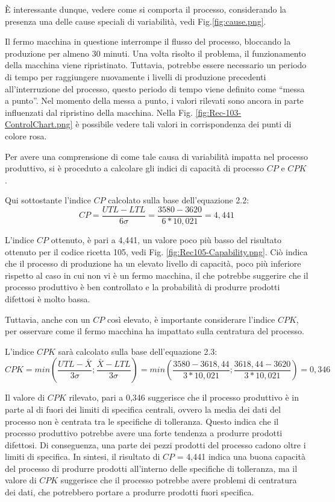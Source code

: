 È interessante dunque, vedere come si comporta il processo, considerando la presenza una delle cause speciali di variabilità, vedi Fig.\ref{fig:cause.png}.

Il fermo macchina in questione interrompe il flusso del processo, bloccando la produzione per almeno 30 minuti.
Una volta risolto il problema, il funzionamento della macchina viene ripristinato. Tuttavia, potrebbe essere necessario un periodo di tempo per raggiungere nuovamente i livelli di produzione precedenti all'interruzione del processo, questo periodo di tempo viene definito come ``messa a punto''.
Nel momento della messa a punto, i valori rilevati sono ancora in parte influenzati dal ripristino della macchina.
Nella Fig. \ref{fig:Rec-103-ControlChart.png} è possibile vedere tali valori in corrispondenza dei punti di colore rosa.

Per avere una comprensione di come tale causa di variabilità impatta nel processo produttivo, si è proceduto a calcolare gli indici di capacità di processo $CP$ e $CPK$.

Qui sottostante l'indice $CP$ calcolato sulla base dell'equazione 2.2:
\begin{equation*} CP = \frac{UTL-LTL}{6\sigma} = \frac{3580-3620}{6 * 10,021} = 4,441
\label {eqn: CP_103_NEW}
\end{equation*}

L'indice $CP$ ottenuto, è pari a 4,441, un valore poco più basso del risultato ottenuto per il codice ricetta 105, vedi Fig. \ref{fig:Rec105-Capability.png}. 
Ciò indica che il processo di produzione ha un elevato livello di capacità, poco più inferiore rispetto al caso in cui non vi è un fermo macchina, il che potrebbe suggerire che il processo produttivo è ben controllato e la probabilità di produrre prodotti difettosi è molto bassa.

Tuttavia, anche con un $CP$ così elevato, è importante considerare l'indice $CPK$, per osservare come il fermo macchina ha impattato sulla centratura del processo.

L'indice $CPK$ sarà calcolato sulla base dell'equazione 2.3:
\begin{equation*}CPK = min\left(\frac{UTL-\bar{X}}{3\sigma} ; 
\frac{\bar{X}-LTL}{3\sigma}\right) = min\left(\frac{3580-3618,44}{3*10,021} ; \frac{3618,44-3620}{3*10,021}\right) = 0,346
\label {eqn: CPK_105_NEW}
\end{equation*}


Il valore di $CPK$ rilevato, pari a 0,346 suggerisce che il processo produttivo è in parte al di fuori dei limiti di specifica centrali, ovvero la media dei dati del processo non è centrata tra le specifiche di tolleranza. Questo indica che il processo produttivo potrebbe avere una forte tendenza a produrre prodotti difettosi.
Di conseguenza, una parte dei pezzi prodotti del processo cadono oltre i limiti di specifica.
In sintesi, il risultato di $CP$ =  4,441 indica una buona capacità del processo di produrre prodotti all'interno delle specifiche di tolleranza, ma il valore di $CPK$ suggerisce che il processo potrebbe avere problemi di centratura dei dati, che potrebbero portare a produrre prodotti fuori specifica.

